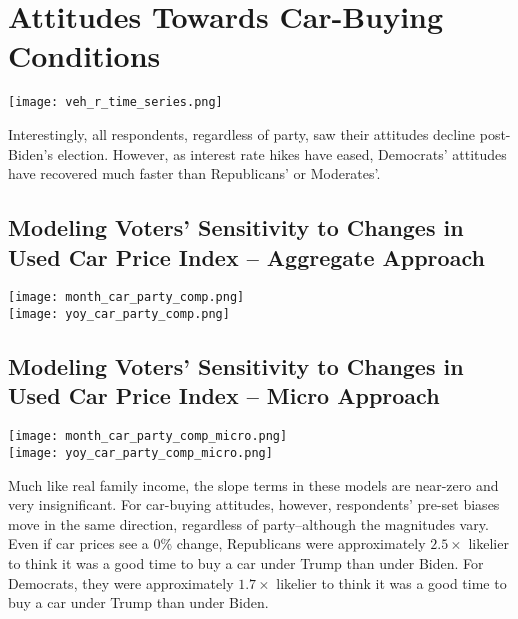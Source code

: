 \documentclass{article}
\begin{document}
\section{Attitudes Towards Car-Buying Conditions}
\centering \texttt{[image: veh\_r\_time\_series.png]} \\
\raggedright Interestingly, all respondents, regardless of party, saw their attitudes decline post-Biden's election. However, as interest rate hikes have eased, Democrats' attitudes have recovered much faster than Republicans' or Moderates'. 

\subsection{Modeling Voters' Sensitivity to Changes in Used Car Price Index -- Aggregate Approach}
\centering \texttt{[image: month\_car\_party\_comp.png]} \\
\texttt{[image: yoy\_car\_party\_comp.png]} \\
\raggedright 

\subsection{Modeling Voters' Sensitivity to Changes in Used Car Price Index -- Micro Approach}
\centering \texttt{[image: month\_car\_party\_comp\_micro.png]} \\
\texttt{[image: yoy\_car\_party\_comp\_micro.png]} \\
\raggedright Much like real family income, the slope terms in these models are near-zero and very insignificant. For car-buying attitudes, however, respondents' pre-set biases move in the same direction, regardless of party--although the magnitudes vary. Even if car prices see a 0\% change, Republicans were approximately $2.5\times$ likelier to think it was a good time to buy a car under Trump than under Biden. For Democrats, they were approximately $1.7\times$ likelier to think it was a good time to buy a car under Trump than under Biden.
\end{document}

